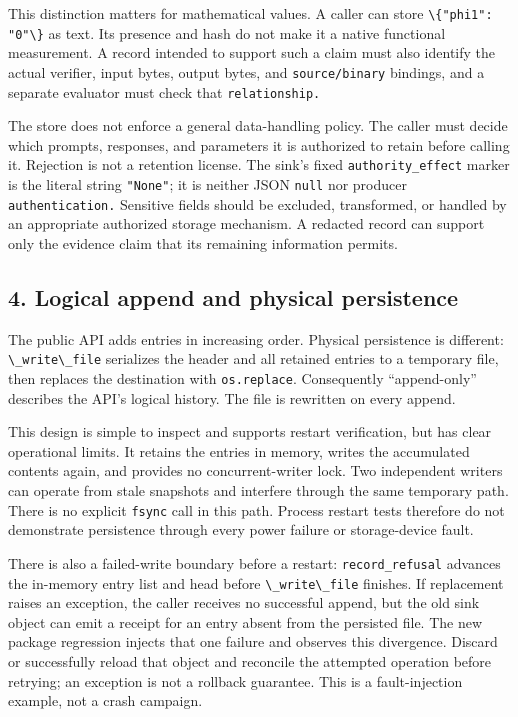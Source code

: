 \documentclass[
  11pt,
]{article}
\newcommand{\passthrough}[1]{#1}
\begin{document}
This distinction matters for mathematical values. A caller can store
\passthrough{\lstinline!\{"phi1": "0"\}!} as text. Its presence and hash
do not make it a native functional measurement. A record intended to
support such a claim must also identify the actual verifier, input
bytes, output bytes, and \nolinkurl{source/binary} bindings, and a
separate evaluator must check that \nolinkurl{relationship.}

The store does not enforce a general data-handling policy. The caller
must decide which prompts, responses, and parameters it is authorized to
retain before calling it. Rejection is not a retention license. The
sink's fixed \nolinkurl{authority_effect} marker is the literal string
\passthrough{\lstinline!"None"!}; it is neither JSON
\passthrough{\lstinline!null!} nor producer \nolinkurl{authentication.}
Sensitive fields should be excluded, transformed, or handled by an
appropriate authorized storage mechanism. A redacted record can support
only the evidence claim that its remaining information permits.

\subsection{4. Logical append and physical
persistence}\label{logical-append-and-physical-persistence}

The public API adds entries in increasing order. Physical persistence is
different: \passthrough{\lstinline!\_write\_file!} serializes the header
and all retained entries to a temporary file, then replaces the
destination with \passthrough{\lstinline!os.replace!}. Consequently
``append-only'' describes the API's logical history. The file is
rewritten on every append.

This design is simple to inspect and supports restart verification, but
has clear operational limits. It retains the entries in memory, writes
the accumulated contents again, and provides no concurrent-writer lock.
Two independent writers can operate from stale snapshots and interfere
through the same temporary path. There is no explicit
\passthrough{\lstinline!fsync!} call in this path. Process restart tests
therefore do not demonstrate persistence through every power failure or
storage-device fault.

There is also a failed-write boundary before a restart:
\nolinkurl{record_refusal} advances the in-memory entry list and head
before \passthrough{\lstinline!\_write\_file!} finishes. If replacement
raises an exception, the caller receives no successful append, but the
old sink object can emit a receipt for an entry absent from the
persisted file. The new package regression injects that one failure and
observes this divergence. Discard or successfully reload that object and
reconcile the attempted operation before retrying; an exception is not a
rollback guarantee. This is a fault-injection example, not a crash
campaign.
\end{document}

